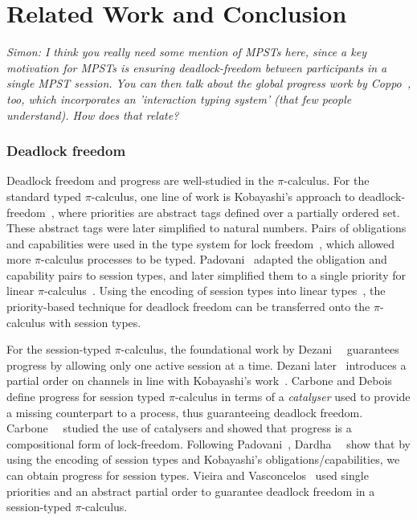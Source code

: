 \documentclass[main.tex]{subfiles}
\begin{document}
\section{Related Work and Conclusion}
\textit{Simon: I think you really need some mention of MPSTs here, since a key motivation for MPSTs is ensuring deadlock-freedom between participants in a single MPST session. You can then talk about the global progress work by Coppo~\etal, too, which incorporates an 'interaction typing system' (that few people understand). How does that relate?}

\subsubsection*{Deadlock freedom}

Deadlock freedom and progress are well-studied in the $\pi$-calculus.
For the standard typed $\pi$-calculus, one line of work is Kobayashi's approach to deadlock-freedom~\cite{kobayashi98}, where priorities are abstract tags defined over a partially ordered set. These abstract tags were later simplified to natural numbers. Pairs of obligations and capabilities were used in the type system for lock freedom~\cite{kobayashi02,kobayashi06}, which allowed more $\pi$-calculus processes to be typed. Padovani~\cite{padovani13} adapted the obligation and capability pairs to session types, and later simplified them to a single priority for linear $\pi$-calculus~\cite{padovani14}. Using the encoding of session types into linear types~\cite{kobayashi07,dardhagiachino12,dardha14beat,dardha16}, the priority-based technique for deadlock freedom can be transferred onto the $\pi$-calculus with session types.

For the session-typed $\pi$-calculus, the foundational work by Dezani~\etal~\cite{dezani-ciancaglinimostrous06} guarantees progress by allowing only one active session at a time. Dezani later~\cite{dezani-ciancagliniliguoro09progress} introduces a partial order on channels in line with Kobayashi's work~\cite{kobayashi98}. Carbone and Debois~\cite{carbonedebois10} define progress for session typed $\pi$-calculus in terms of a \emph{catalyser} used to provide a missing counterpart to a process, thus guaranteeing deadlock freedom.
Carbone~\etal~\cite{carbonedardha14} studied the use of catalysers and showed that progress is a compositional form of lock-freedom. Following Padovani~\cite{padovani14}, Dardha~\etal~\cite{dardhagiachino12} show that by using the encoding of session types and Kobayashi's obligations/capabilities, we can obtain progress for session types. Vieira and Vasconcelos~\cite{vieiravasconcelos13} used single priorities and an abstract partial order to guarantee deadlock freedom in a session-typed $\pi$-calculus.
\end{document}
